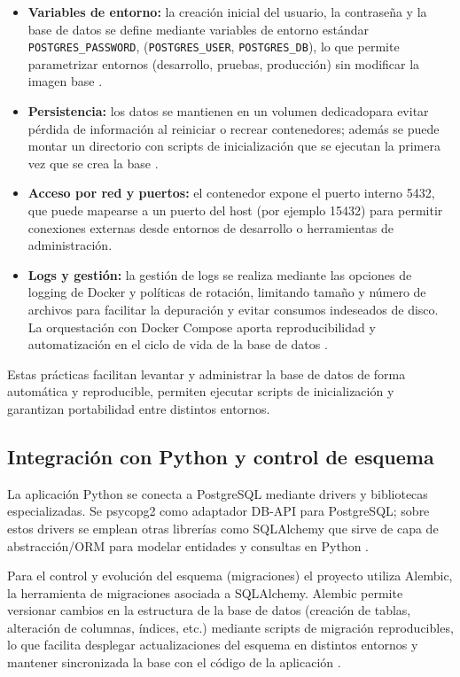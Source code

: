 \documentclass[12pt, a4paper]{article}
\begin{document}
\begin{itemize}
	\item \textbf{Variables de entorno:} la creación inicial del usuario, la contraseña y la base de datos se define mediante variables de entorno estándar \texttt{POSTGRES\_PASSWORD}, (\texttt{POSTGRES\_USER}, \texttt{POSTGRES\_DB}), lo que permite parametrizar entornos (desarrollo, pruebas, producción) sin modificar la imagen base \cite{docker_postgres}.
	\item \textbf{Persistencia:} los datos se mantienen en un volumen dedicadopara evitar pérdida de información al reiniciar o recrear contenedores; además se puede montar un directorio con scripts de inicialización que se ejecutan la primera vez que se crea la base \cite{docker_persist,docker_postgres}.
	\item \textbf{Acceso por red y puertos:} el contenedor expone el puerto interno 5432, que puede mapearse a un puerto del host (por ejemplo 15432) para permitir conexiones externas desde entornos de desarrollo o herramientas de administración.
	\item \textbf{Logs y gestión:} la gestión de logs se realiza mediante las opciones de logging de Docker y políticas de rotación, limitando tamaño y número de archivos para facilitar la depuración y evitar consumos indeseados de disco. La orquestación con Docker Compose aporta reproducibilidad y automatización en el ciclo de vida de la base de datos \cite{docker_persist}.
\end{itemize}

Estas prácticas facilitan levantar y administrar la base de datos de forma automática y reproducible, permiten ejecutar scripts de inicialización y garantizan portabilidad entre distintos entornos.

\subsection{Integración con Python y control de esquema}

La aplicación Python se conecta a PostgreSQL mediante drivers y bibliotecas especializadas. Se psycopg2 como adaptador DB-API para PostgreSQL; sobre estos drivers se emplean otras librerías como SQLAlchemy que sirve de capa de abstracción/ORM para modelar entidades y consultas en Python \cite{psycopg2_doc,sqlalchemy_doc}.

Para el control y evolución del esquema (migraciones) el proyecto utiliza Alembic, la herramienta de migraciones asociada a SQLAlchemy. Alembic permite versionar cambios en la estructura de la base de datos (creación de tablas, alteración de columnas, índices, etc.) mediante scripts de migración reproducibles, lo que facilita desplegar actualizaciones del esquema en distintos entornos y mantener sincronizada la base con el código de la aplicación \cite{alembic_doc}.
\end{document}

